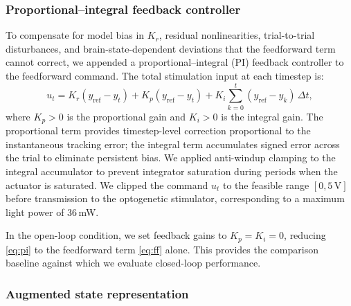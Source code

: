 \subsubsection*{Proportional--integral feedback controller}
\label{sec:pi_controller_design}

To compensate for model bias in $K_{r}$, residual nonlinearities,
trial-to-trial disturbances, and brain-state-dependent deviations that
the feedforward term cannot correct, we appended a
proportional--integral (PI) feedback controller to the feedforward
command. The total stimulation input at each timestep is:
%
\begin{equation}
    u_{t} = K_{r}(y_{\mathrm{ref}} - y_{t})
          + K_{p}(y_{\mathrm{ref}} - y_{t})
          + K_{i}\sum_{k=0}^{t}(y_{\mathrm{ref}} - y_{k})\,\Delta t,
    \label{eq:pi}
\end{equation}
%
where $K_{p} > 0$ is the proportional gain and $K_{i} > 0$ is the
integral gain. The proportional term provides timestep-level correction
proportional to the instantaneous tracking error; the integral term
accumulates signed error across the trial to eliminate persistent bias.
We applied anti-windup clamping to the integral accumulator to prevent
integrator saturation during periods when the actuator is saturated. We
clipped the command $u_{t}$ to the feasible range $[0, 5\,\mathrm{V}]$
before transmission to the optogenetic stimulator, corresponding to a
maximum light power of 36\,mW.

In the open-loop condition, we set feedback gains to $K_{p} = K_{i} =
0$, reducing \eqref{eq:pi} to the feedforward term \eqref{eq:ff} alone.
This provides the comparison baseline against which we evaluate
closed-loop performance.

\subsubsection*{Augmented state representation}

